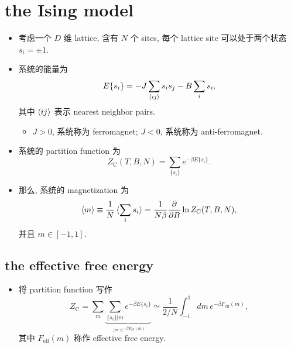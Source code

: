 \chapter{the Ising model}
\begin{itemize}
	\item 考虑一个 $D$ 维 lattice, 含有 $N$ 个 sites, 每个 lattice site 可以处于两个状态 $s_i = \pm 1$.
	
	\item 系统的能量为
	\begin{equation}
		E\{s_i\} = - J \sum_{\braket{i j}} s_i s_j - B \sum_i s_i,
	\end{equation}
	其中 $\braket{i j}$ 表示 nearest neighbor pairs.
	\begin{itemize}
		\item $J > 0$, 系统称为 ferromagnet; $J < 0$, 系统称为 anti-ferromagnet.
	\end{itemize}
	
	\item 系统的 partition function 为
	\begin{equation}
		Z_\text{C}(T, B, N) = \sum_{\{s_i\}} e^{- \beta E\{s_i\}}.
	\end{equation}
	
	\item 那么, 系统的 magnetization 为
	\begin{equation}
		\braket{m} \equiv \frac{1}{N} \braket{\sum_i s_i} = \frac{1}{N \beta} \frac{\partial}{\partial B} \ln Z_\text{C}(T, B, N),
	\end{equation}
	并且 $m \in [- 1, 1]$.
\end{itemize}

\section{the effective free energy}
\begin{itemize}
	\item 将 partition function 写作
	\begin{equation}
		Z_\text{C} = \sum_m \underbrace{\sum_{\{s_i\} | m} e^{- \beta E\{s_i\}}}_{:= e^{- \beta F_\text{eff}(m)}} \simeq \frac{1}{2 / N} \int_{- 1}^1 dm \, e^{- \beta F_\text{eff}(m)},
	\end{equation}
	其中 $F_\text{eff}(m)$ 称作 effective free energy.
\end{itemize}
